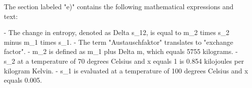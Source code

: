 The section labeled "e)" contains the following mathematical expressions and text:

- The change in entropy, denoted as Delta s_12, is equal to m_2 times s_2 minus m_1 times s_1.
- The term "Austauschfaktor" translates to "exchange factor".
- m_2 is defined as m_1 plus Delta m, which equals 5755 kilograms.
- s_2 at a temperature of 70 degrees Celsius and x equals 1 is 0.854 kilojoules per kilogram Kelvin.
- s_1 is evaluated at a temperature of 100 degrees Celsius and x equals 0.005.